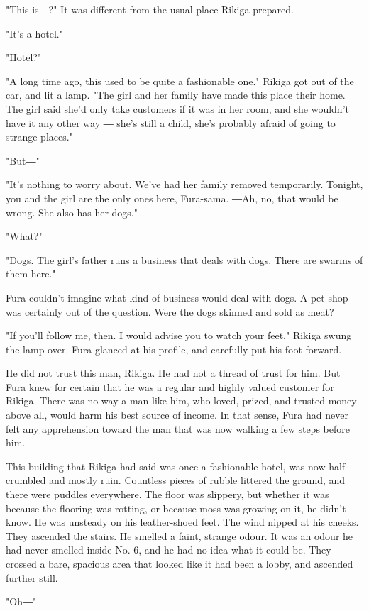 "This is―?" It was different from the usual place Rikiga prepared.

"It's a hotel."

"Hotel?"

"A long time ago, this used to be quite a fashionable one." Rikiga got
out of the car, and lit a lamp. "The girl and her family have made this
place their home. The girl said she'd only take customers if it was in
her room, and she wouldn't have it any other way ― she's still a child,
she's probably afraid of going to strange places."

"But―"

"It's nothing to worry about. We've had her family removed temporarily.
Tonight, you and the girl are the only ones here, Fura-sama. ―Ah, no,
that would be wrong. She also has her dogs."

"What?"

"Dogs. The girl's father runs a business that deals with dogs. There are
swarms of them here."

Fura couldn't imagine what kind of business would deal with dogs. A pet
shop was certainly out of the question. Were the dogs skinned and sold
as meat?

"If you'll follow me, then. I would advise you to watch your feet."
Rikiga swung the lamp over. Fura glanced at his profile, and carefully
put his foot forward.

He did not trust this man, Rikiga. He had not a thread of trust for him.
But Fura knew for certain that he was a regular and highly valued
customer for Rikiga. There was no way a man like him, who loved, prized,
and trusted money above all, would harm his best source of income. In
that sense, Fura had never felt any apprehension toward the man that was
now walking a few steps before him.

This building that Rikiga had said was once a fashionable hotel, was now
half-crumbled and mostly ruin. Countless pieces of rubble littered the
ground, and there were puddles everywhere. The floor was slippery, but
whether it was because the flooring was rotting, or because moss was
growing on it, he didn't know. He was unsteady on his leather-shoed
feet. The wind nipped at his cheeks. They ascended the stairs. He
smelled a faint, strange odour. It was an odour he had never smelled
inside No. 6, and he had no idea what it could be. They crossed a bare,
spacious area that looked like it had been a lobby, and ascended further
still.

"Oh―"

